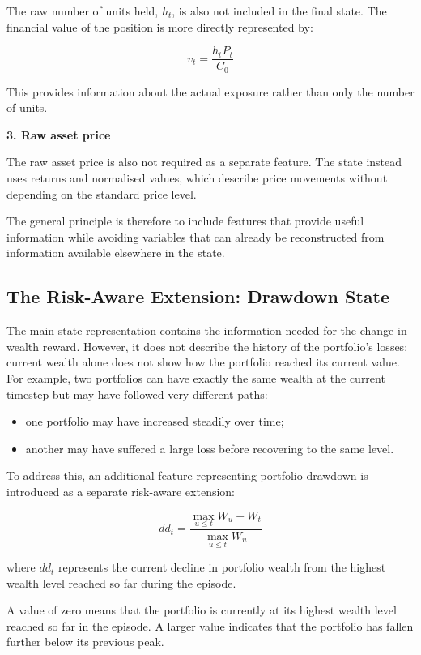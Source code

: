 The raw number of units held, \(h_{t}\), is also not included in the
final state. The financial value of the position is more directly
represented by:

\[v_{t} = \frac{h_{t}P_{t}}{C_{0}}\]

This provides information about the actual exposure rather than only the
number of units.

\textbf{3. Raw asset price}

The raw asset price is also not required as a separate feature. The
state instead uses returns and normalised values, which describe price
movements without depending on the standard price level.

The general principle is therefore to include features that provide
useful information while avoiding variables that can already be
reconstructed from information available elsewhere in the state.

\subsection{The Risk-Aware Extension: Drawdown State}

The main state representation contains the information needed for the
change in wealth reward. However, it does not describe the history of
the portfolio's losses: current wealth alone does not show how the
portfolio reached its current value. For example, two portfolios can
have exactly the same wealth at the current timestep but may have
followed very different paths:

\begin{itemize}
\item
  one portfolio may have increased steadily over time;
\item
  another may have suffered a large loss before recovering to the same
  level.
\end{itemize}

To address this, an additional feature representing portfolio drawdown
is introduced as a separate risk-aware extension:

\[dd_{t} = \frac{\max_{u \leq t}W_{u} - W_{t}}{\max_{u \leq t}W_{u}}\]

where \(dd_{t}\) represents the current decline in portfolio wealth from
the highest wealth level reached so far during the episode.

A value of zero means that the portfolio is currently at its highest
wealth level reached so far in the episode. A larger value indicates
that the portfolio has fallen further below its previous peak.

